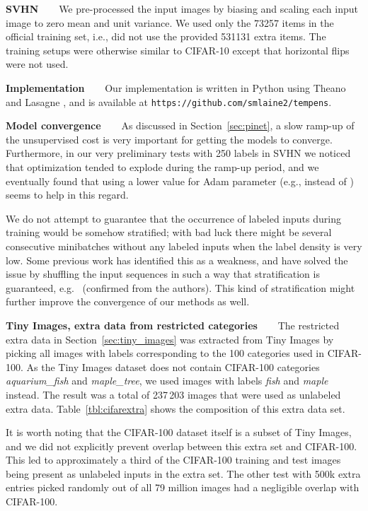 \documentclass{article}
\begin{document}
\textbf{SVHN\ \ \ }
We pre-processed the input images by biasing and scaling each input image to zero mean and unit variance. 
We used only the 73257 items in the official training set, i.e., did not use the provided
531131 extra items. The training setups were otherwise similar to CIFAR-10 except that horizontal flips were not used.

\textbf{Implementation\ \ \ }
Our implementation is written in Python using Theano \citep{theano} and Lasagne \citep{lasagne}, and is available at {\tt https://github.com/smlaine2/tempens}.

\textbf{Model convergence\ \ \ }
As discussed in Section~\ref{sec:pinet}, a slow ramp-up of the unsupervised cost is very important for getting the models to converge.
Furthermore, in our very preliminary tests with 250 labels in SVHN we noticed that optimization tended to explode during the ramp-up period, and we eventually found that using a lower value for Adam  parameter (e.g.,  instead of ) seems to help in this regard. 

We do not attempt to guarantee that the occurrence of labeled inputs during training would be somehow stratified; with bad luck there might be several consecutive minibatches without any labeled inputs when the label density is very low. Some previous work has identified this as a weakness, and have solved the issue by shuffling the input sequences in such a way that stratification is guaranteed, e.g.~\cite{ladder} (confirmed from the authors). This kind of stratification might further improve the convergence of our methods as well.

\textbf{Tiny Images, extra data from restricted categories\ \ \ }
The restricted extra data in Section~\ref{sec:tiny_images} was extracted from Tiny Images by picking all images with labels corresponding to the 100 categories used in CIFAR-100. As the Tiny Images dataset does not contain CIFAR-100 categories \emph{aquarium\_fish} and \emph{maple\_tree}, we used images with labels \emph{fish} and \emph{maple} instead. The result was a total of 237\,203 images that were used as unlabeled extra data. Table~\ref{tbl:cifarextra} shows the composition of this extra data set.

It is worth noting that the CIFAR-100 dataset itself is a subset of Tiny Images, and we did not explicitly prevent overlap between this extra set and CIFAR-100. This led to approximately a third of the CIFAR-100 training and test images being present as unlabeled inputs in the extra set. The other test with 500k extra entries picked randomly out of all 79 million images had a negligible overlap with CIFAR-100.
\end{document}

